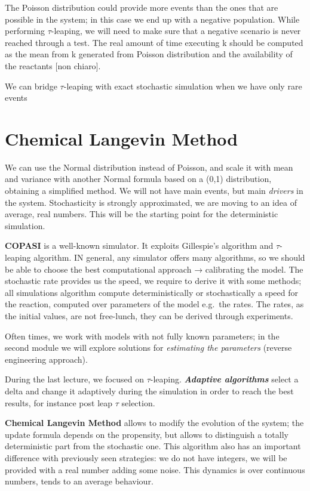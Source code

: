 The Poisson distribution could provide more events than the ones that
are possible in the system; in this case we end up with a negative
population. While performing $\tau$-leaping, we will need to make sure
that a negative scenario is never reached through a test. The real
amount of time executing k should be computed as the mean from k
generated from Poisson distribution and the availability of the
reactants {[}non chiaro{]}.

We can bridge $\tau$-leaping with exact stochastic simulation when we
have only rare events

\hypertarget{chemical-langevin-method}{%
\section{\texorpdfstring{\textbf{Chemical Langevin
Method}}{Chemical Langevin Method}}\label{chemical-langevin-method}}

We can use the Normal distribution instead of Poisson, and scale it with
mean and variance with another Normal formula based on a (0,1)
distribution, obtaining a simplified method. We will not have main
events, but main \emph{drivers} in the system. Stochasticity is strongly
approximated, we are moving to an idea of average, real numbers. This
will be the starting point for the deterministic simulation.

\textbf{COPASI} is a well-known simulator. It exploits Gillespie's
algorithm and $\tau$-leaping algorithm. IN general, any simulator offers
many algorithms, so we should be able to choose the best computational
approach → calibrating the model. The stochastic rate provides us the
speed, we require to derive it with some methods; all simulations
algorithm compute deterministically or stochastically a speed for the
reaction, computed over parameters of the model e.g.~the rates. The
rates, as the initial values, are not free-lunch, they can be derived
through experiments.

Often times, we work with models with not fully known parameters; in the
second module we will explore solutions for \emph{estimating the
parameters} (reverse engineering approach).

During the last lecture, we focused on $\tau$-leaping.
\textbf{\emph{Adaptive algorithms}} select a delta and change it
adaptively during the simulation in order to reach the best results, for
instance post leap $\tau$ selection.

\textbf{Chemical Langevin Method} allows to modify the evolution of the
system; the update formula depends on the propensity, but allows to
distinguish a totally deterministic part from the stochastic one. This
algorithm also has an important difference with previously seen
strategies: we do not have integers, we will be provided with a real
number adding some noise. This dynamics is over continuous numbers,
tends to an average behaviour.

